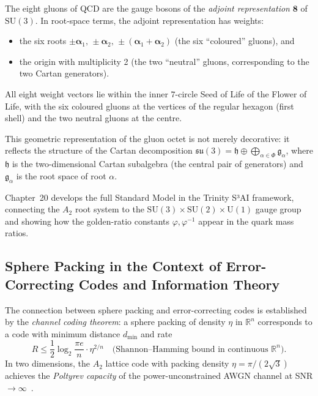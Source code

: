 The eight gluons of QCD are the gauge bosons of the \emph{adjoint
representation} \(\mathbf{8}\) of \(\mathrm{SU}(3)\).  In root-space
terms, the adjoint representation has weights:
\begin{itemize}
  \item the six roots \(\pm\boldsymbol{\alpha}_1,\,\pm\boldsymbol{\alpha}_2,\,
        \pm(\boldsymbol{\alpha}_1+\boldsymbol{\alpha}_2)\) (the six ``coloured''
        gluons), and
  \item the origin with multiplicity 2 (the two ``neutral'' gluons,
        corresponding to the two Cartan generators).
\end{itemize}
All eight weight vectors lie within the inner \(7\)-circle Seed of Life
of the Flower of Life, with the six coloured gluons at the vertices of
the regular hexagon (first shell) and the two neutral gluons at the centre.

This geometric representation of the gluon octet is not merely
decorative: it reflects the structure of the Cartan decomposition
\(\mathfrak{su}(3) = \mathfrak{h} \oplus \bigoplus_{\alpha\in\Phi}\mathfrak{g}_\alpha\),
where \(\mathfrak{h}\) is the two-dimensional Cartan subalgebra (the
central pair of generators) and \(\mathfrak{g}_\alpha\) is the
root space of root \(\alpha\).

Chapter~20 develops the full Standard Model in the Trinity S³AI
framework, connecting the \(A_2\) root system to the
\(\mathrm{SU}(3)\times\mathrm{SU}(2)\times\mathrm{U}(1)\) gauge group
and showing how the golden-ratio constants \(\varphi,\varphi^{-1}\)
appear in the quark mass ratios.

\subsection{Sphere Packing in the Context of Error-Correcting Codes
            and Information Theory}
\label{subsec:fol-codes}

The connection between sphere packing and error-correcting codes is
established by the \emph{channel coding theorem}: a sphere packing
of density \(\eta\) in \(\mathbb{R}^n\) corresponds to a code with
minimum distance \(d_{\min}\) and rate
\[
  R \le \frac{1}{2}\log_2\frac{\pi e}{n}\cdot\eta^{2/n}
    \quad\text{(Shannon--Hamming bound in continuous \(\mathbb{R}^n\))}.
\]
In two dimensions, the \(A_2\) lattice code with packing density
\(\eta=\pi/(2\sqrt{3})\) achieves the \emph{Poltyrev capacity} of the
power-unconstrained AWGN channel at SNR \(\to\infty\)~\cite{conway_sphere_packings}.

